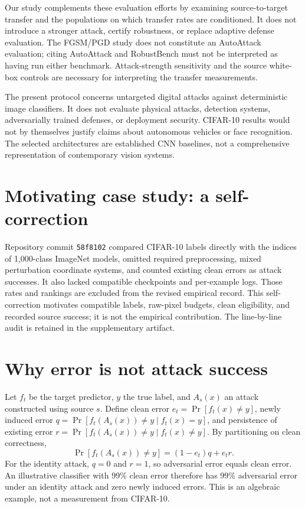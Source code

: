 \documentclass[10pt,twocolumn]{article}
\begin{document}
Our study complements these evaluation efforts by examining source-to-target transfer and the populations on which transfer rates are conditioned. It does not introduce a stronger attack, certify robustness, or replace adaptive defense evaluation. The FGSM/PGD study does not constitute an AutoAttack evaluation; citing AutoAttack and RobustBench must not be interpreted as having run either benchmark. Attack-strength sensitivity and the source white-box controls are necessary for interpreting the transfer measurements.

The present protocol concerns untargeted digital attacks against deterministic image classifiers. It does not evaluate physical attacks, detection systems, adversarially trained defenses, or deployment security. CIFAR-10 results would not by themselves justify claims about autonomous vehicles or face recognition. The selected architectures are established CNN baselines, not a comprehensive representation of contemporary vision systems.

\section{Motivating case study: a self-correction}
Repository commit \texttt{58f8102} compared CIFAR-10 labels directly with the indices of 1,000-class ImageNet models, omitted required preprocessing, mixed perturbation coordinate systems, and counted existing clean errors as attack successes. It also lacked compatible checkpoints and per-example logs. Those rates and rankings are excluded from the revised empirical record. This self-correction motivates compatible labels, raw-pixel budgets, clean eligibility, and recorded source success; it is not the empirical contribution. The line-by-line audit is retained in the supplementary artifact.

\section{Why error is not attack success}
Let $f_t$ be the target predictor, $y$ the true label, and $A_s(x)$ an attack constructed using source $s$. Define clean error $e_t=\Pr[f_t(x)\ne y]$, newly induced error $q=\Pr[f_t(A_s(x))\ne y\mid f_t(x)=y]$, and persistence of existing error $r=\Pr[f_t(A_s(x))\ne y\mid f_t(x)\ne y]$. By partitioning on clean correctness,
\begin{equation}
\Pr[f_t(A_s(x))\ne y]=(1-e_t)q+e_t r.
\end{equation}
For the identity attack, $q=0$ and $r=1$, so adversarial error equals clean error. An illustrative classifier with 99\% clean error therefore has 99\% adversarial error under an identity attack and zero newly induced errors. This is an algebraic example, not a measurement from CIFAR-10.
\end{document}

